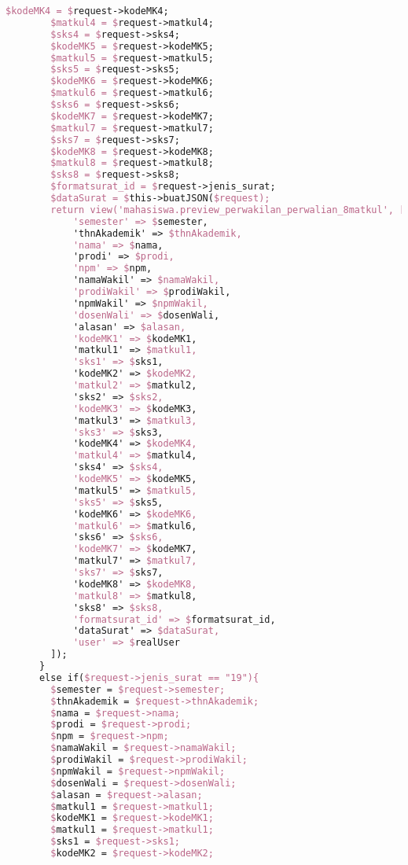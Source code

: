 \begin{lstlisting}[language=tex,basicstyle=\tiny,caption=PesanansuratController.php]
        $kodeMK4 = $request->kodeMK4;
        $matkul4 = $request->matkul4;
        $sks4 = $request->sks4;
        $kodeMK5 = $request->kodeMK5;
        $matkul5 = $request->matkul5;
        $sks5 = $request->sks5;
        $kodeMK6 = $request->kodeMK6;
        $matkul6 = $request->matkul6;
        $sks6 = $request->sks6;
        $kodeMK7 = $request->kodeMK7;
        $matkul7 = $request->matkul7;
        $sks7 = $request->sks7;
        $kodeMK8 = $request->kodeMK8;
        $matkul8 = $request->matkul8;
        $sks8 = $request->sks8;
        $formatsurat_id = $request->jenis_surat;
        $dataSurat = $this->buatJSON($request);
        return view('mahasiswa.preview_perwakilan_perwalian_8matkul', [
            'semester' => $semester,
            'thnAkademik' => $thnAkademik,
            'nama' => $nama,
            'prodi' => $prodi,
            'npm' => $npm,
            'namaWakil' => $namaWakil,
            'prodiWakil' => $prodiWakil,
            'npmWakil' => $npmWakil,
            'dosenWali' => $dosenWali,
            'alasan' => $alasan,
            'kodeMK1' => $kodeMK1,
            'matkul1' => $matkul1,
            'sks1' => $sks1,
            'kodeMK2' => $kodeMK2,
            'matkul2' => $matkul2,
            'sks2' => $sks2,
            'kodeMK3' => $kodeMK3,
            'matkul3' => $matkul3,
            'sks3' => $sks3,
            'kodeMK4' => $kodeMK4,
            'matkul4' => $matkul4,
            'sks4' => $sks4,
            'kodeMK5' => $kodeMK5,
            'matkul5' => $matkul5,
            'sks5' => $sks5,
            'kodeMK6' => $kodeMK6,
            'matkul6' => $matkul6,
            'sks6' => $sks6,
            'kodeMK7' => $kodeMK7,
            'matkul7' => $matkul7,
            'sks7' => $sks7,
            'kodeMK8' => $kodeMK8,
            'matkul8' => $matkul8,
            'sks8' => $sks8,
            'formatsurat_id' => $formatsurat_id,
            'dataSurat' => $dataSurat,
            'user' => $realUser
        ]);
      }
      else if($request->jenis_surat == "19"){
        $semester = $request->semester;
        $thnAkademik = $request->thnAkademik;
        $nama = $request->nama;
        $prodi = $request->prodi;
        $npm = $request->npm;
        $namaWakil = $request->namaWakil;
        $prodiWakil = $request->prodiWakil;
        $npmWakil = $request->npmWakil;
        $dosenWali = $request->dosenWali;
        $alasan = $request->alasan;
        $matkul1 = $request->matkul1;
        $kodeMK1 = $request->kodeMK1;
        $matkul1 = $request->matkul1;
        $sks1 = $request->sks1;
        $kodeMK2 = $request->kodeMK2;

\end{lstlisting}
